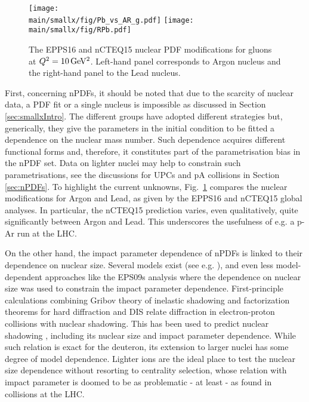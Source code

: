 \documentclass[../report.tex]{subfiles}
\providecommand{\main}{..}
\begin{document}
\begin{figure}[htb!]
\centering
\texttt{[image: \\main/smallx/fig/Pb\_vs\_AR\_g.pdf]}
\texttt{[image: \\main/smallx/fig/RPb.pdf]}
\caption{The EPPS16 and nCTEQ15 nuclear PDF modifications for gluons at $Q^2=10\,{\rm GeV^2}$. 
Left-hand panel corresponds to Argon nucleus and the right-hand panel to the Lead nucleus.} 
\label{fig:lightnPDF}
\end{figure}

First, concerning nPDFs, it should be noted that due to the scarcity of nuclear data, a PDF fit or a single nucleus is impossible as discussed in Section \ref{sec:smallxIntro}. The different groups \cite{deFlorian:2011fp,Kovarik:2015cma,Eskola:2016oht}  have adopted different strategies but, generically, they give the parameters in the initial condition to be fitted a dependence on the nuclear mass number. Such dependence acquires different functional forms and, therefore, it constitutes part of the parametrisation bias in the nPDF set. Data on lighter nuclei may help to constrain such parametrisations, see the discussions for UPCs and pA collisions in Section \ref{sec:nPDFs}. To highlight the current unknowns, Fig.~\ref{fig:lightnPDF} compares the nuclear modifications for Argon and Lead, as given by the EPPS16 and nCTEQ15 global analyses. In particular, the nCTEQ15 prediction varies, even qualitatively, quite significantly between Argon and Lead. This underscores the usefulness of e.g. a p-Ar run at the LHC.  

On the other hand, the impact parameter dependence of nPDFs is linked to their dependence on nuclear size. Several models exist (see e.g. \cite{Emelyanov:1998phs,Ferreiro:2008wc}), and even less model-dependent approaches like the EPS09s analysis \cite{Helenius:2012wd} where the dependence on nuclear size was used to constrain the impact parameter dependence. First-principle calculations combining Gribov theory of inelastic shadowing and factorization theorems for hard diffraction and DIS relate diffraction in electron-proton collisions with nuclear shadowing. This has been used to predict nuclear shadowing \cite{Frankfurt:2011cs,Armesto:2003fi}, including its nuclear size and impact parameter dependence. While such relation is exact for the deuteron, its extension to larger nuclei has some degree of model dependence. Lighter ions are the ideal place to test the nuclear size dependence without resorting to centrality selection, whose relation with impact parameter is doomed to be as problematic - at least - as found in \pPb collisions at the LHC.
\end{document}
